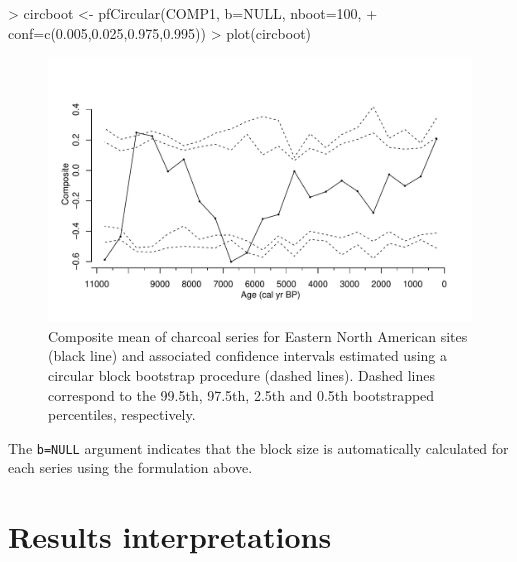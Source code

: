 \documentclass{elsarticle}
\begin{document}
\begin{Schunk}
\begin{Sinput}
> circboot <- pfCircular(COMP1, b=NULL, nboot=100,
+                         conf=c(0.005,0.025,0.975,0.995))
> plot(circboot)
\end{Sinput}
\end{Schunk}

\begin{figure}
\centering
\includegraphics{paleofire-paper-fig3}

\caption{Composite mean of charcoal series for Eastern North American sites (black line) and associated confidence intervals estimated using a circular block bootstrap procedure (dashed lines). Dashed lines correspond to the 99.5th, 97.5th, 2.5th and 0.5th bootstrapped percentiles, respectively.}
\end{figure}
The \texttt{b=NULL} argument indicates that the block size is automatically calculated for each series using the formulation above.

\section{Results interpretations}
\end{document}
